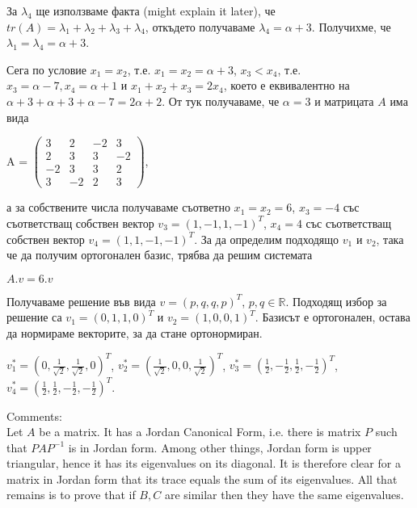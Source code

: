 \documentclass{article}
\begin{document}
\justify
За $\lambda_4$ ще използваме факта (might explain it later), че $tr(A) = \lambda_1 + \lambda_2 + \lambda_3 + \lambda_4$, откъдето получаваме $\lambda_4 = \alpha + 3$. Получихме, че $\lambda_1 = \lambda_4 = \alpha + 3$.

\justify
Сега по условие $x_1 = x_2$, т.е. $x_1 = x_ 2 = \alpha + 3$, $x_3 < x_4$, т.е. $x_3 = \alpha - 7, x_4 = \alpha + 1$ и $x_1 + x_2 + x_3 = 2x_4$, което е еквивалентно на $\alpha + 3 + \alpha + 3 + \alpha - 7 = 2\alpha + 2$. От тук получаваме, че $\alpha = 3$ и матрицата $A$ има вида

\begin{center}
    A = $\begin{pmatrix}
         3 & 2 & -2 & 3 \\
         2 & 3 & 3 & -2 \\
         -2 & 3 & 3 & 2 \\
         3 & -2 & 2 & 3
         \end{pmatrix}$,
\end{center}

\justify
а за собствените числа получаваме съответно $x_1 = x_2 = 6$, $x_3 = -4$ със съответстващ собствен вектор $v_3 = (1,-1,1,-1)^T$, $x_4 = 4$ със съответстващ собствен вектор $v_4 = (1,1,-1,-1)^T$. За да определим подходящо $v_1$ и $v_2$, така че да получим ортогонален базис, трябва да решим системата 

\begin{center}
    $A.v = 6.v$
\end{center}

\justify
Получаваме решение във вида $v = (p,q,q,p)^T$, $p,q \in \mathbb{R}$. Подходящ избор за решение са $v_1 = (0,1,1,0)^T$ и $v_2 = (1,0,0,1)^T$. Базисът е ортогонален, остава да нормираме векторите, за да стане ортонормиран.

\justify
$v_1^* = (0,\frac{1}{\sqrt{2}},\frac{1}{\sqrt{2}},0)^T$, $v_2^* = (\frac{1}{\sqrt{2}},0,0,\frac{1}{\sqrt{2}})^T$, $v_3^* = (\frac{1}{2},-\frac{1}{2},\frac{1}{2},-\frac{1}{2})^T$, $v_4^* = (\frac{1}{2},\frac{1}{2},-\frac{1}{2},-\frac{1}{2})^T$.

\justify
Comments: \\
Let $A$ be a matrix.  It has a Jordan Canonical Form, i.e. there is matrix $P$ such that $PAP^{-1}$ is in Jordan form.  Among other things, Jordan form is upper triangular, hence it has its eigenvalues on its diagonal.  It is therefore clear for a matrix in Jordan form that its trace equals the sum of its eigenvalues.  All that remains is to prove that if $B,C$ are similar then they have the same eigenvalues.
\end{document}
